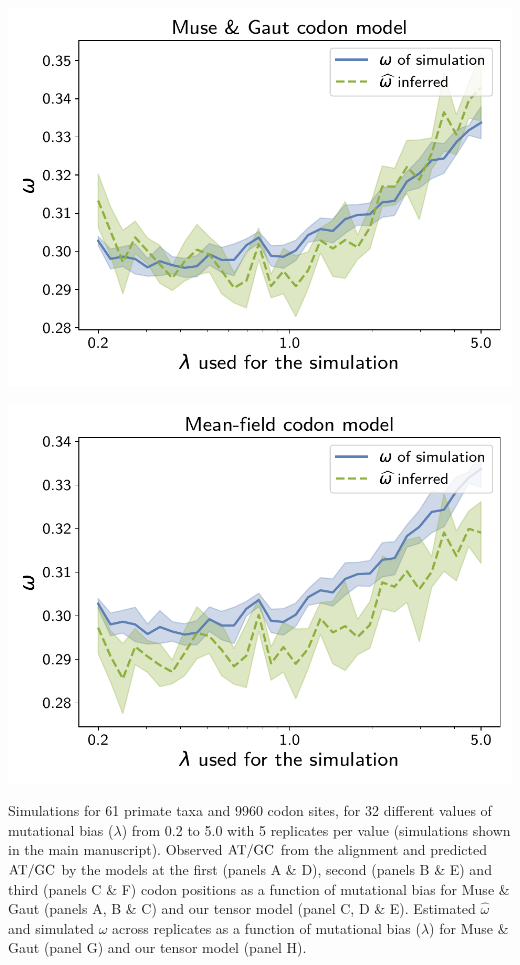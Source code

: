 \documentclass{article}
\begin{document}
\begin{center}
\begin{minipage}{0.325\linewidth}
        \includegraphics[width=\linewidth, page=1]{inference_simulations/omega_MG.pdf}
    \end{minipage}
    \begin{minipage}{0.325\linewidth}
        \includegraphics[width=\linewidth, page=1]{inference_simulations/omega_MF.pdf}
    \end{minipage}
\end{center}
Simulations for 61 primate taxa and 9960 codon sites, for 32 different values of mutational bias ($\lambda$) from 0.2 to 5.0 with 5 replicates per value (simulations shown in the main manuscript).
Observed $\text{AT/GC}$ from the alignment and predicted $\text{AT/GC}$ by the models at the first (panels A \& D), second (panels B \& E) and third (panels C \& F) codon positions as a function of mutational bias for Muse \& Gaut (panels A, B \& C) and our tensor model (panel C, D \& E).
Estimated $\hat{\omega}$ and simulated $\omega$ across replicates as a function of mutational bias ($\lambda$) for Muse \& Gaut (panel G) and our tensor model (panel H).
\end{document}
